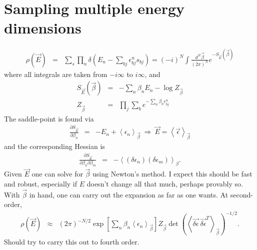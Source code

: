\documentclass[11pt]{article}
\newcommand{\bea}{\begin{eqnarray}}
\newcommand{\eea}{\end{eqnarray}}
\newcommand{\braket}[1]{\left \langle #1 \right \rangle}
\begin{document}
\section*{Sampling multiple energy dimensions}
\bea
\rho(\vec{E}) &=& \sum_s \prod_n \delta \left( E_n - \sum_{bj} \epsilon^n_{bj} s_{bj} \right)  =  (-i)^N  \int \frac{d^N \vec{\beta}}{(2 \pi)^N} e^{-S_{\vec{E}}(\vec{\beta})} 
\eea
where all integrals are taken from $- i \infty$ to $i \infty$, and
\bea
S_{\vec{E}} (\vec{\beta}) &=& - \sum_n \beta_n E_n - \log Z_{\vec{\beta}} \\ 
Z_{\vec{\beta}} & = & \prod_j \sum_b e^{- \sum_n \beta_n \epsilon^n_{bj}} 
\eea
The saddle-point is found via
\bea
\frac{\partial S_{\vec{E}}}{\partial \beta_n} & = & -E_n + \braket{\epsilon_n}_{\vec{\beta}} ~\Rightarrow ~\vec{E} = \braket{\vec{\epsilon}}_{\vec{\beta}}  
\eea
and the corresponding Hessian is
\bea
\frac{\partial S_{\vec{E}}}{\partial \beta_n \partial \beta_m} & = & - \braket{(\delta \epsilon_n) (\delta \epsilon_m)}_{\beta}.
\eea
Given $\vec{E}$ one can solve for $\vec{\beta}$ using Newton's method. I expect this should be fast and robust, especially if $E$ doesn't change all that much, perhaps provably so. With $\vec{\beta}$ in hand, one can carry out the expansion as far as one wants. At second-order, 
\bea
\rho(\vec{E}) & \approx & (2 \pi)^{-N/2} \exp \left[ \sum_n \beta _n \braket{\epsilon_n}_{\vec{\beta}} \right] Z_{\vec{\beta}} \det \left( \braket{\vec{\delta \epsilon}~\vec{\delta \epsilon}^T}_{\vec{\beta}} \right)^{-1/2}.
\eea 
Should try to carry this out to fourth order. 
\end{document}
